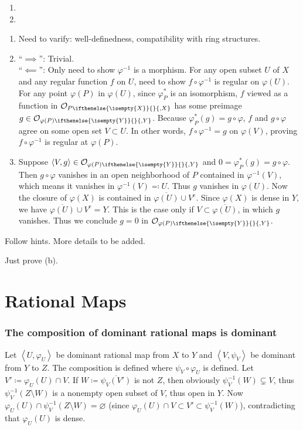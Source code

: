 \documentclass{note}
\newcommand{\lring}[2][]{\mathcal{O}_{#2\ifthenelse{\isempty{#1}}{}{,#1}}}
\newcommand{\union}{\cup}
\newcommand{\closure}{\overline}
\newcommand{\cmpl}[1]{#1^\text{c}}
\newcommand{\chevrons}[1]{\left\langle#1\right\rangle}
\newcommand{\rational}[2]{\chevrons{#1,#2}}
\begin{document}
\begin{enumerate}
\item
\item 
\end{enumerate}


\begin{enumerate}
\item Need to varify: well-definedness, compatibility with ring
  structures.
\item
  ``$\implies$'': Trivial.\\
  ``$\impliedby$'': Only need to show $\varphi^{-1}$ is a
  morphism. For any open subset $U$ of $X$ and any regular function
  $f$ on $U$, need to show $f\circ\varphi^{-1}$ is regular on
  $\varphi(U)$. For any point $\varphi(P)$ in $\varphi(U)$, since
  $\varphi_P^*$ is an isomorphism, $f$ viewed as a function in
  $\lring[X]{P}$ has some preimage
  $g\in\lring[Y]{\varphi(P)}$. Because
  $\varphi_P^*(g) = g\circ\varphi$, $f$ and $g\circ\varphi$ agree on
  some open set $V\subset U$. In other words, $f\circ\varphi^{-1} = g$ on
  $\varphi(V)$, proving $f\circ\varphi^{-1}$ is regular at
  $\varphi(P)$.
\item Suppose $\chevrons{V,g}\in\lring[Y]{\varphi(P)}$ and
  $0 = \varphi_P^*(g) = g\circ\varphi$. Then $g\circ\varphi$ vanishes
  in an open neighborhood of $P$ contained in $\varphi^{-1}(V)$, which
  means it vanishes in $\varphi^{-1}(V)\eqqcolon U$. Thus $g$ vanishes
  in $\varphi(U)$. Now the closure of $\varphi(X)$ is contained in
  $\closure{\varphi(U)}\union\cmpl{V}$. Since $\varphi(X)$ is dense in
  $Y$, we have $\closure{\varphi(U)}\union\cmpl{V} = Y$. This is the
  case only if $V\subset\closure{\varphi(U)}$, in which $g$
  vanishes. Thus we conclude $g = 0$ in $\lring[Y]{\varphi(P)}$.
\end{enumerate}

Follow hints. More details to be added.

Just prove (b).

\section{Rational Maps}
\subsubsection*{The composition of dominant rational maps is dominant}
Let $\rational{U}{\varphi_U}$ be dominant rational map from $X$ to $Y$
and $\rational{V}{\psi_V}$ be dominant from $Y$ to $Z$. The
composition is defined where $\psi_V\circ\varphi_U$ is defined. Let
$V'\coloneqq\varphi_U(U)\cap V$. If $W\coloneqq\closure{\psi_V(V')}$
is not $Z$, then obviously $\psi_V^{-1}(W) \subsetneq V$, thus
$\psi_V^{-1}(Z\setminus W)$ is a nonempty open subset of $V$, thus
open in $Y$. Now
$\varphi_U(U) \cap \psi_V^{-1}(Z\setminus W) = \varnothing$ (since
$\varphi_U(U) \cap V \subset V' \subset \psi_V^{-1}(W)$),
contradicting that $\varphi_U(U)$ is dense.
\end{document}
